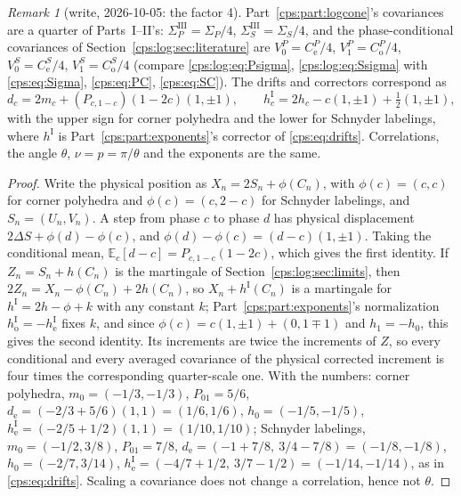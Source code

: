\documentclass[11pt,letterpaper]{article}
\numberwithin{equation}{section}
\theoremstyle{remark}\newtheorem{remark}[theorem]{Remark}
\newcommand{\EE}{\mathbb E}
\newcommand{\e}{\mathrm e}
\newcommand{\oState}{\mathrm o}
\begin{document}
\begin{remark}[write, 2026-10-05: the factor 4]\label{cps:log:rem:scale}
Part~\ref{cps:part:logcone}'s covariances are a quarter of Parts~I--II's:
$\Sigma_P^{\mathrm{III}}=\Sigma_P/4$, $\Sigma_S^{\mathrm{III}}=\Sigma_S/4$, and the phase-conditional
covariances of Section~\ref{cps:log:sec:literature} are $V^P_0=C^P_{\e}/4$, $V^P_1=C^P_{\oState}/4$,
$V^S_0=C^S_{\e}/4$, $V^S_1=C^S_{\oState}/4$ (compare \eqref{cps:log:eq:Psigma},
\eqref{cps:log:eq:Ssigma} with \eqref{cps:eq:Sigma}, \eqref{cps:eq:PC}, \eqref{cps:eq:SC}). The
drifts and correctors correspond as
\[
 d_c=2m_c+(P_{c,1-c})(1-2c)(1,\pm1),\qquad
 h^{\mathrm{I}}_c=2h_c-c(1,\pm1)+\tfrac12(1,\pm1),
\]
with the upper sign for corner polyhedra and the lower for Schnyder labelings, where
$h^{\mathrm{I}}$ is Part~\ref{cps:part:exponents}'s corrector of \eqref{cps:eq:drifts}.
Correlations, the angle $\theta$, $\nu=p=\pi/\theta$ and the exponents are the same.
\end{remark}
\begin{proof}
Write the physical position as $X_n=2S_n+\phi(C_n)$, with $\phi(c)=(c,c)$ for corner polyhedra
and $\phi(c)=(c,2-c)$ for Schnyder labelings, and $S_n=(U_n,V_n)$. A step from phase $c$ to phase
$d$ has physical displacement $2\Delta S+\phi(d)-\phi(c)$, and $\phi(d)-\phi(c)=(d-c)(1,\pm1)$.
Taking the conditional mean, $\EE_c[d-c]=P_{c,1-c}(1-2c)$, which gives the first identity.
If $Z_n=S_n+h(C_n)$ is the martingale of Section~\ref{cps:log:sec:limits}, then
$2Z_n=X_n-\phi(C_n)+2h(C_n)$, so $X_n+h^{\mathrm{I}}(C_n)$ is a martingale for
$h^{\mathrm{I}}=2h-\phi+k$ with any constant $k$; Part~\ref{cps:part:exponents}'s normalization
$h^{\mathrm{I}}_{\oState}=-h^{\mathrm{I}}_{\e}$ fixes $k$, and since $\phi(c)=c(1,\pm1)+(0,1\mp1)$ and
$h_1=-h_0$, this gives the second identity. Its increments are twice the increments of $Z$, so
every conditional and every averaged covariance of the physical corrected increment is four
times the corresponding quarter-scale one. With the numbers: corner polyhedra,
$m_0=(-1/3,-1/3)$, $P_{01}=5/6$, $d_{\e}=(-2/3+5/6)(1,1)=(1/6,1/6)$, $h_0=(-1/5,-1/5)$,
$h^{\mathrm{I}}_{\e}=(-2/5+1/2)(1,1)=(1/10,1/10)$; Schnyder labelings, $m_0=(-1/2,3/8)$,
$P_{01}=7/8$, $d_{\e}=(-1+7/8,\ 3/4-7/8)=(-1/8,-1/8)$, $h_0=(-2/7,3/14)$,
$h^{\mathrm{I}}_{\e}=(-4/7+1/2,\ 3/7-1/2)=(-1/14,-1/14)$, as in \eqref{cps:eq:drifts}. Scaling a
covariance does not change a correlation, hence not $\theta$.
\end{proof}
\end{document}
